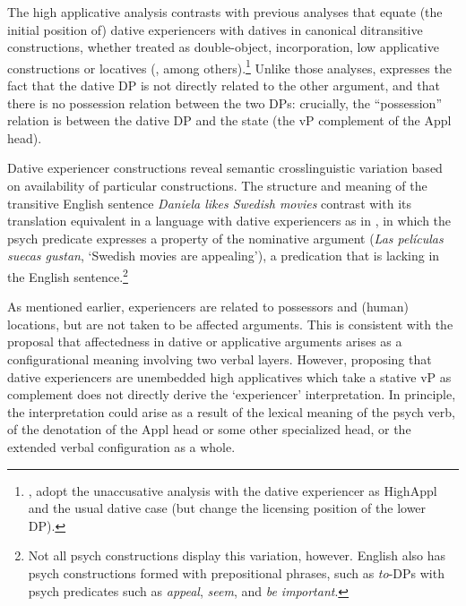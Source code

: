 \documentclass[output=paper,colorlinks,citecolor=brown,nonflat]{./langscibook}
\begin{document}







The high applicative analysis contrasts with previous analyses that equate (the initial position of) dative experiencers with datives in canonical ditransitive constructions, whether treated as double-object, incorporation, low applicative constructions or locatives (\citealt{BellettiRizzi1988, Masullo1992thesis}, among others).\footnote{\citealt{Acedo-MatellánMateu2015}, \citealt{Pujalte2015} adopt the unaccusative analysis with the dative experiencer as HighAppl and the usual dative case (but change the licensing position of the lower DP).}   Unlike those analyses,  expresses the fact that the dative DP is not directly related to the other argument, and that there is no possession relation between the two DPs: crucially, the “possession” relation is between the dative DP and the state (the vP complement of the Appl head). 

Dative experiencer constructions reveal semantic crosslinguistic variation based on availability of particular constructions. The structure and meaning of the transitive English sentence \textit{Daniela likes Swedish movies} contrast with its translation equivalent in a language with dative experiencers as in , in which the psych predicate expresses a property of the nominative argument (\textit{Las películas suecas gustan}, ‘Swedish movies are appealing’), a predication that is lacking in the English sentence.\footnote{Not all psych constructions display this variation, however. English also has psych constructions formed with prepositional phrases, such as \textit{to}-DPs with psych predicates such as \textit{appeal}, \textit{seem}, and \textit{be important}.} 

As mentioned earlier, experiencers are related to possessors and (human) locations, but are not taken to be affected arguments. This is consistent with the proposal that affectedness in dative or applicative arguments arises as a configurational meaning involving two verbal layers. However, proposing that dative experiencers are unembedded high applicatives which take a stative vP as complement does not directly derive the ‘experiencer’ interpretation. In principle, the interpretation could arise as a result of the lexical meaning of the psych verb, of the denotation of the Appl head or some other specialized head, or the extended verbal configuration as a whole. 
\end{document}
